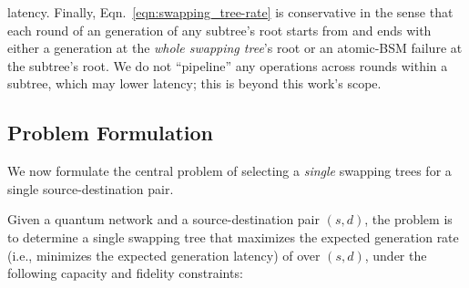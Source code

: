 latency. 
Finally, Eqn.~\ref{eqn:swapping_tree-rate}
is conservative in the sense that 
each round of an \eps generation of any subtree's root starts from 
and ends with either a 
\eps generation at the \textit{whole swapping tree}'s root
or an atomic-BSM failure at the subtree's root.
We do not ``pipeline'' any operations across rounds within a subtree, which may lower
latency; this is beyond this work's scope. 



\subsection{Problem Formulation}
\label{sec:swapping_formulation}

We now formulate the central problem of selecting a \textit{single} swapping trees for a single source-destination pair. 

 Given a quantum network and a source-destination pair $(s,d)$, 
the \spp problem is to determine a single swapping tree that maximizes the expected
generation rate (i.e., minimizes the expected generation latency) of \epss over
$(s,d)$, under the following capacity and fidelity constraints:

